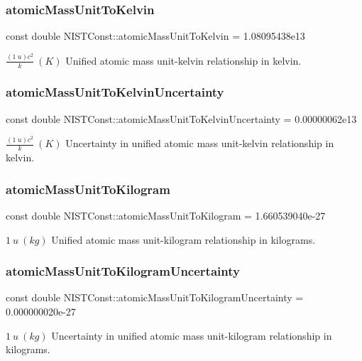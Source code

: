\subsubsection{\texorpdfstring{atomic\+Mass\+Unit\+To\+Kelvin}{atomicMassUnitToKelvin}}
{\footnotesize\ttfamily const double N\+I\+S\+T\+Const\+::atomic\+Mass\+Unit\+To\+Kelvin = 1.\+08095438e13}

$\frac{(1\ u)c^2}{k} \ (K)$ Unified atomic mass unit-\/kelvin relationship in kelvin. \mbox{\label{group___atomic_mass_unit_ga124459785d7b4bcbc5a97ed591d859ae}} 
\subsubsection{\texorpdfstring{atomic\+Mass\+Unit\+To\+Kelvin\+Uncertainty}{atomicMassUnitToKelvinUncertainty}}
{\footnotesize\ttfamily const double N\+I\+S\+T\+Const\+::atomic\+Mass\+Unit\+To\+Kelvin\+Uncertainty = 0.\+00000062e13}

$\frac{(1\ u)c^2}{k} \ (K)$ Uncertainty in unified atomic mass unit-\/kelvin relationship in kelvin. \mbox{\label{group___atomic_mass_unit_gafdd40d93803d15e1ff887dc12c49ca99}} 
\subsubsection{\texorpdfstring{atomic\+Mass\+Unit\+To\+Kilogram}{atomicMassUnitToKilogram}}
{\footnotesize\ttfamily const double N\+I\+S\+T\+Const\+::atomic\+Mass\+Unit\+To\+Kilogram = 1.\+660539040e-\/27}

$1\ u\ (kg)$ Unified atomic mass unit-\/kilogram relationship in kilograms. \mbox{\label{group___atomic_mass_unit_ga8726643b734abfa2cc6c41b98f59f8c2}} 
\subsubsection{\texorpdfstring{atomic\+Mass\+Unit\+To\+Kilogram\+Uncertainty}{atomicMassUnitToKilogramUncertainty}}
{\footnotesize\ttfamily const double N\+I\+S\+T\+Const\+::atomic\+Mass\+Unit\+To\+Kilogram\+Uncertainty = 0.\+000000020e-\/27}

$1\ u\ (kg)$ Uncertainty in unified atomic mass unit-\/kilogram relationship in kilograms. 